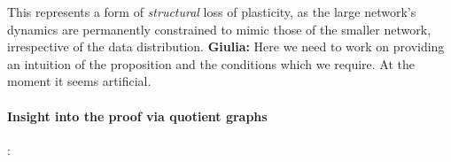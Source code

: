 \documentclass{article}
\newcommand{\giulia}[1]{{\color{ForestGreen}\textbf{Giulia:} #1}}
\newtheorem{proposition}{Proposition}[section]
\newtheorem{corollary}{Corollary}[section]
\begin{document}

This represents a form of \emph{structural} loss of plasticity, as the large network's dynamics are permanently constrained to mimic those of the smaller network, irrespective of the data distribution. \giulia{Here we need to work on providing an intuition of the proposition and the conditions which we require. At the moment it seems artificial.}

\paragraph{Insight into the proof via quotient graphs}: 

\end{document}
